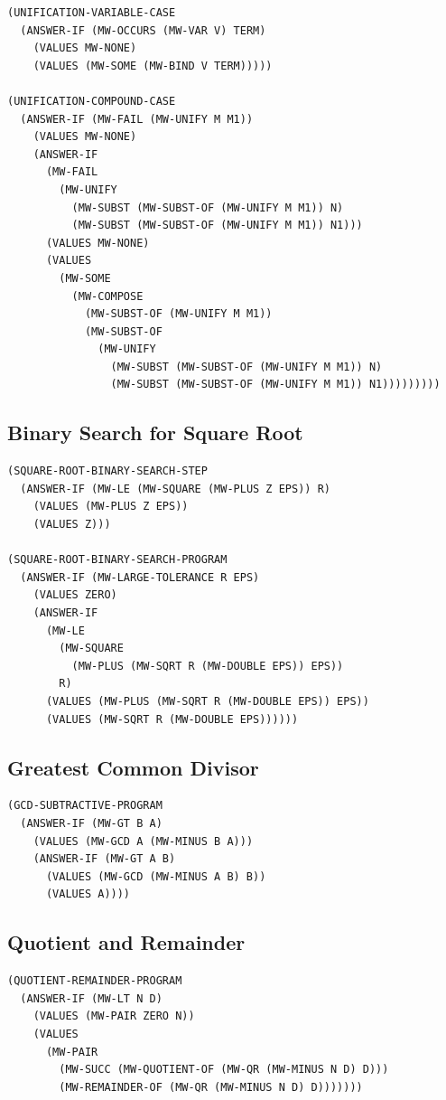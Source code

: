 \documentclass[runningheads]{llncs}
\begin{document}
\begin{lstlisting}
(UNIFICATION-VARIABLE-CASE
  (ANSWER-IF (MW-OCCURS (MW-VAR V) TERM)
    (VALUES MW-NONE)
    (VALUES (MW-SOME (MW-BIND V TERM)))))

(UNIFICATION-COMPOUND-CASE
  (ANSWER-IF (MW-FAIL (MW-UNIFY M M1))
    (VALUES MW-NONE)
    (ANSWER-IF
      (MW-FAIL
        (MW-UNIFY
          (MW-SUBST (MW-SUBST-OF (MW-UNIFY M M1)) N)
          (MW-SUBST (MW-SUBST-OF (MW-UNIFY M M1)) N1)))
      (VALUES MW-NONE)
      (VALUES
        (MW-SOME
          (MW-COMPOSE
            (MW-SUBST-OF (MW-UNIFY M M1))
            (MW-SUBST-OF
              (MW-UNIFY
                (MW-SUBST (MW-SUBST-OF (MW-UNIFY M M1)) N)
                (MW-SUBST (MW-SUBST-OF (MW-UNIFY M M1)) N1)))))))))
\end{lstlisting}

\subsection{Binary Search for Square Root}

\begin{lstlisting}
(SQUARE-ROOT-BINARY-SEARCH-STEP
  (ANSWER-IF (MW-LE (MW-SQUARE (MW-PLUS Z EPS)) R)
    (VALUES (MW-PLUS Z EPS))
    (VALUES Z)))

(SQUARE-ROOT-BINARY-SEARCH-PROGRAM
  (ANSWER-IF (MW-LARGE-TOLERANCE R EPS)
    (VALUES ZERO)
    (ANSWER-IF
      (MW-LE
        (MW-SQUARE
          (MW-PLUS (MW-SQRT R (MW-DOUBLE EPS)) EPS))
        R)
      (VALUES (MW-PLUS (MW-SQRT R (MW-DOUBLE EPS)) EPS))
      (VALUES (MW-SQRT R (MW-DOUBLE EPS))))))
\end{lstlisting}

\subsection{Greatest Common Divisor}

\begin{lstlisting}
(GCD-SUBTRACTIVE-PROGRAM
  (ANSWER-IF (MW-GT B A)
    (VALUES (MW-GCD A (MW-MINUS B A)))
    (ANSWER-IF (MW-GT A B)
      (VALUES (MW-GCD (MW-MINUS A B) B))
      (VALUES A))))
\end{lstlisting}

\subsection{Quotient and Remainder}

\begin{lstlisting}
(QUOTIENT-REMAINDER-PROGRAM
  (ANSWER-IF (MW-LT N D)
    (VALUES (MW-PAIR ZERO N))
    (VALUES
      (MW-PAIR
        (MW-SUCC (MW-QUOTIENT-OF (MW-QR (MW-MINUS N D) D)))
        (MW-REMAINDER-OF (MW-QR (MW-MINUS N D) D)))))))
\end{lstlisting}
\end{document}
